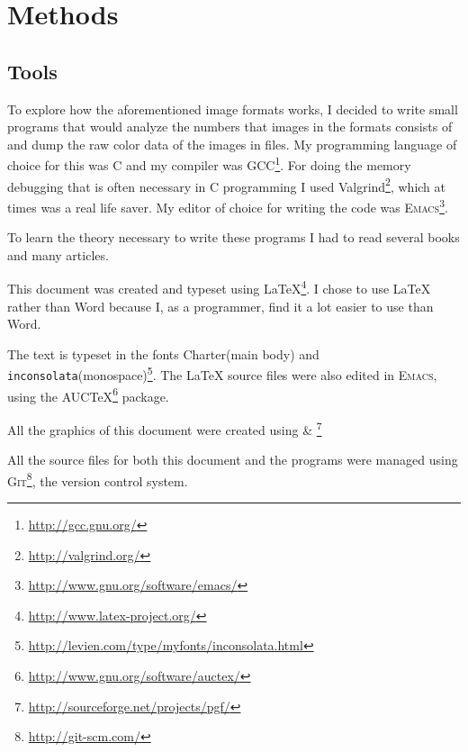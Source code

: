 \begin{comment}
  
\end{comment}

\chapter{Methods}
\label{cha:method}

\newcommand{\CC}{C\nolinebreak\hspace{-.05em}\raisebox{.4ex}{\tiny\bf +}\nolinebreak\hspace{-.10em}\raisebox{.4ex}{\tiny\bf +}}

\section{Tools}

\newcommand{\credits}[1]{\footnote{\url{#1}}}

To explore how the aforementioned image formats works, I decided to
write small programs that would analyze the numbers that images in the
formats consists of and dump the raw color data of the images in
files. My programming language of choice for this was \CC{} and my
compiler was GCC\credits{http://gcc.gnu.org/}. For doing the memory
debugging that is often necessary in \CC{} programming I used
Valgrind\credits{http://valgrind.org/}, which at times was a real life
saver. My editor of choice for writing the code was \textsc{Emacs}\credits{http://www.gnu.org/software/emacs/}.

To learn the theory necessary to write these programs I had to read
several books and many articles.

This document was created and typeset using
\LaTeX{}\credits{http://www.latex-project.org/}. I chose to use
\LaTeX{} rather than Word because I, as a programmer, find it a lot
easier to use than Word.

The text is typeset in the fonts Charter(main body) and
\texttt{inconsolata}(monospace)\credits{http://levien.com/type/myfonts/inconsolata.html}. The
\LaTeX{} source files were also edited in \textsc{Emacs}, using the
AUC\TeX{}\credits{http://www.gnu.org/software/auctex/} package.

All the graphics of this document were created using
\tikzname \& \pgf\credits{http://sourceforge.net/projects/pgf/}

All the source files for both this document and the programs were
managed using \textsc{Git}\credits{http://git-scm.com/}, the version control system.

